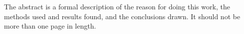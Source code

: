 
The abstract is a formal description of the reason for doing this work, the methods used and results found, and the conclusions drawn. It should not be more than one page in length.
